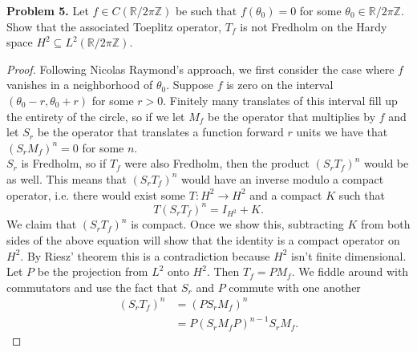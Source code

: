 \documentclass[11pt,letterpaper]{report}
\newcommand{\integers}{\mathbb{Z}}
\newcommand{\reals}{\mathbb{R}}
\begin{document}
\noindent\textbf{Problem 5. }Let $f\in C(\reals/2\pi \integers)$ be such that $f(\theta_0) = 0$ for some $\theta_0\in \reals/2\pi \integers$. Show that the associated Toeplitz operator, $T_f$ is not Fredholm on the Hardy space $H^2\subseteq L^2(\reals/2\pi\integers)$.
\begin{proof}
	Following Nicolas Raymond's approach, we first consider the case where $f$ vanishes in a neighborhood of $\theta_0$. Suppose $f$ is zero on the interval $(\theta_0-r, \theta_0+r)$ for some $r>0$. Finitely many translates of this interval fill up the entirety of the circle, so if we let $M_f$ be the operator that multiplies by $f$ and let $S_r$ be the operator that translates a function forward $r$ units we have that $(S_rM_f)^n = 0$ for some $n$.\\

	\noindent $S_r$ is Fredholm, so if $T_f$ were also Fredholm, then the product $(S_rT_f)^n$ would be as well. This means that $(S_rT_f)^n$ would have an inverse modulo a compact operator, i.e. there would exist some $T: H^2\to H^2$ and a compact $K$ such that
	\[
	T(S_rT_f)^n = I_{H^2} + K.
	\]
	We claim that $(S_rT_f)^n$ is compact. Once we show this, subtracting $K$ from both sides of the above equation will show that the identity is a compact operator on $H^2$. By Riesz' theorem this is a contradiction because $H^2$ isn't finite dimensional.\\

	\noindent Let $P$ be the projection from $L^2$ onto $H^2$. Then $T_f = PM_f$. We fiddle around with commutators and use the fact that $S_r$ and $P$ commute with one another
	\begin{align*}
		(S_rT_f)^n &= (PS_rM_f)^n\\
		&= P(S_rM_fP)^{n-1}S_rM_f.
	\end{align*}

\end{proof}
\end{document}
